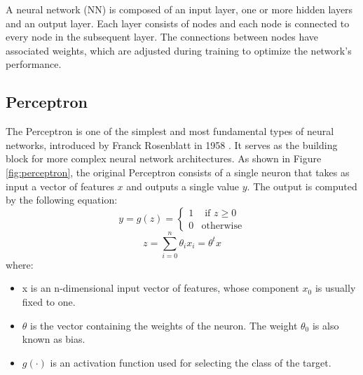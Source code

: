 \documentclass[11pt,english,listoffigures,listoftables]{tfgetsinf}
\begin{document}
A neural network (NN) is composed of an input layer, one or more hidden layers and an output layer. Each layer consists of nodes and each node is connected to every node in the subsequent layer. The connections between nodes have associated weights, which are adjusted during training to optimize the network's performance.

\subsection{Perceptron}

The Perceptron is one of the simplest and most fundamental types of neural networks, introduced by Franck Rosenblatt in 1958 \cite{minsky1988perceptrons}. It serves as the building block for more complex neural network architectures. As shown in Figure \ref{fig:perceptron}, the original Perceptron consists of a single neuron that takes as input a vector of features \( x \) and outputs a single value \( y \). The output is computed by the following equation:
%
\begin{equation}
    y = g(z) = 
    \begin{cases}
        1 & \text{ if } z \ge 0 \\
        0 & \text{otherwise}
    \end{cases}
\end{equation}
%
\begin{equation}
    z = \sum_{i=0}^n\theta_ix_i = \theta^{t}x
\end{equation}
%
where:
\begin{itemize}
    \item x is an n-dimensional input vector of features, whose component \( x_0 \) is usually fixed to one.
    \item \( \theta \) is the vector containing the weights of the neuron. The weight \( \theta_0 \) is also known as bias.
    \item $g(\cdot)$ is an activation function used for selecting the class of the target.
\end{itemize}
\end{document}
